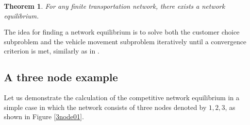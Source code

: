 \documentclass[dissertation,draft*]{aaltoseries}
\newtheorem{theorem}{Theorem}
\begin{document}
\begin{theorem}
For any finite transportation network, there exists a network equilibrium.
\end{theorem}


The idea for finding a network equilibrium is to solve 
both the customer choice subproblem and the vehicle movement subproblem iteratively 
until a convergence criterion is met, similarly as in \citep{yang2010}. 
% 

\subsection{A three node example}
\label{compexample}
Let us demonstrate the calculation of the competitive network equilibrium in a simple case 
in which the network consists of three nodes denoted by $1,2,3$, as shown in Figure \ref{3node01}. 
\end{document}
